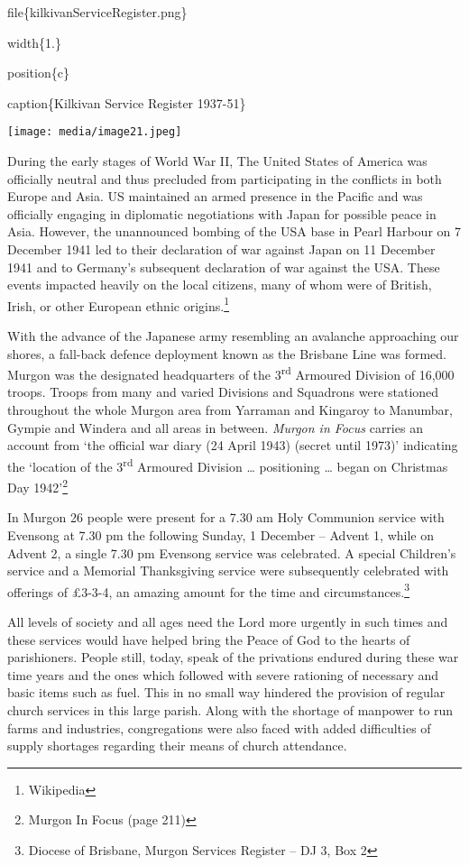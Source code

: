 file\{kilkivanServiceRegister.png\}

width\{1.\}

position\{c\}

caption\{Kilkivan Service Register 1937-51\}

\texttt{[image: media/image21.jpeg]}

During the early stages of World War II, The United States of America was officially neutral and thus precluded from participating in the conflicts in both Europe and Asia. US maintained an armed presence in the Pacific and was officially engaging in diplomatic negotiations with Japan for possible peace in Asia. However, the unannounced bombing of the USA base in Pearl Harbour on 7 December 1941 led to their declaration of war against Japan on 11 December 1941 and to Germany's subsequent declaration of war against the USA. These events impacted heavily on the local citizens, many of whom were of British, Irish, or other European ethnic origins.\footnote{Wikipedia}

With the advance of the Japanese army resembling an avalanche approaching our shores, a fall-back defence deployment known as the Brisbane Line was formed. Murgon was the designated headquarters of the 3\textsuperscript{rd} Armoured Division of 16,000 troops. Troops from many and varied Divisions and Squadrons were stationed throughout the whole Murgon area from Yarraman and Kingaroy to Manumbar, Gympie and Windera and all areas in between. \emph{Murgon in Focus} carries an account from `the official war diary (24 April 1943) (secret until 1973)' indicating the `location of the 3\textsuperscript{rd} Armoured Division \ldots{} positioning \ldots{} began on Christmas Day 1942'\footnote{Murgon In Focus (page 211)}

In Murgon 26 people were present for a 7.30 am Holy Communion service with Evensong at 7.30 pm the following Sunday, 1 December -- Advent 1, while on Advent 2, a single 7.30 pm Evensong service was celebrated. A special Children's service and a Memorial Thanksgiving service were subsequently celebrated with offerings of £3-3-4, an amazing amount for the time and circumstances.\footnote{Diocese of Brisbane, Murgon Services Register -- DJ 3, Box 2}

All levels of society and all ages need the Lord more urgently in such times and these services would have helped bring the Peace of God to the hearts of parishioners. People still, today, speak of the privations endured during these war time years and the ones which followed with severe rationing of necessary and basic items such as fuel. This in no small way hindered the provision of regular church services in this large parish. Along with the shortage of manpower to run farms and industries, congregations were also faced with added difficulties of supply shortages regarding their means of church attendance.

